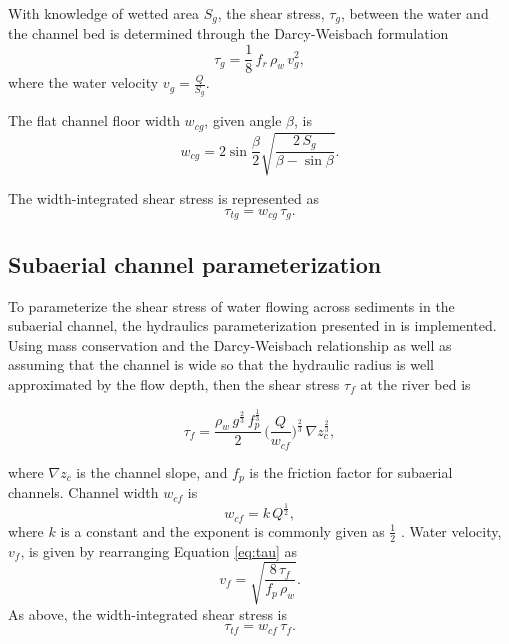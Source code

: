 \documentclass[draft]{agujournal2019}
\newcommand{\mauro}[1]{{\textbf{\color{green}Mauro says:} \color{green} #1} }
\begin{document}
With knowledge of wetted area $S_g$, the shear stress, $\tau_g$, between the water and the channel bed is determined through the Darcy-Weisbach formulation
\begin{equation}
  \label{eq:tau}
  \tau_g=\frac{1}{8}\,f_r\,\rho_w\,v_g^2,
\end{equation}
%
where  the water velocity $v_g = \frac{Q}{S_g}$.

The flat channel floor width $w_{cg}$, given angle $\beta$, is
\begin{equation}
  \label{eq:dh2wc}
  w_{cg} = 2  \sin \frac{\beta}{2} \sqrt{\frac{2\, S_g}{\beta -\sin \beta}}.
\end{equation}

The width-integrated shear stress is represented as
\begin{equation}
  \label{eq:tautg}
  \tau_{tg}=w_{cg}\,\tau_g.
\end{equation}

\subsection{Subaerial channel  parameterization}
\label{sect:fluv}

To parameterize the shear stress of water flowing across sediments in the subaerial channel,  the hydraulics parameterization presented in  is implemented.
Using mass conservation and the Darcy-Weisbach relationship as well as assuming that the channel is wide so that the hydraulic radius is well approximated by the flow depth, then
the shear stress $\tau_f$ at the river bed is
\begin{linenomath*}
  \begin{equation}
    \label{eq:DW_tau}
    \tau_f=\frac{\rho_w\,g^{\frac{2}{3}}\,f_p^{\frac{1}{3}}}{2}\, \Big(\frac{Q}{w_{cf}} \Big)^{\frac{2}{3}} \,\nabla z_c^{\frac{2}{3}},
  \end{equation}
\end{linenomath*}
where $\nabla z_c$ is the channel slope, and $f_p$ is the friction factor for subaerial channels.
Channel width $w_{cf}$ is
\begin{equation}
  \label{eq:wcf}
  w_{cf} = k \, Q^\frac{1}{2},
\end{equation}
%
where $k$ is a constant and the exponent is commonly given as $\frac{1}{2}$ \cite{leopold1953}.
Water velocity, $v_f$, is given by rearranging Equation \ref{eq:tau} as
\begin{equation}
  \label{eq:vf}
  v_f = \sqrt{\frac{8\,\tau_f}{f_p\,\rho_w}}.
\end{equation}
%
As above, the width-integrated shear stress is
\begin{equation}
    \label{eq:tautf}
    \tau_{tf}=w_{cf}\,\tau_f.
  \end{equation}
  
\end{document}
